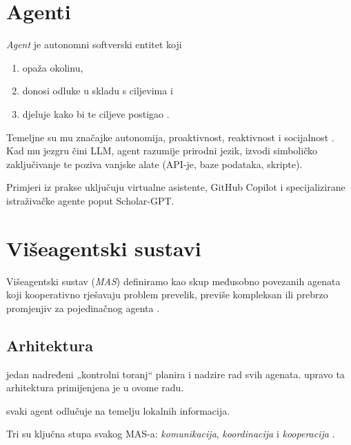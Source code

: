 \documentclass[zavrsnirad]{fer}
\begin{document}
\section{Agenti}
\label{subsec:Agent}

\emph{Agent} je autonomni softverski entitet koji
\begin{enumerate}[label=(\alph*)]
  \item opaža okolinu,
  \item donosi odluke u skladu s ciljevima i
  \item djeluje kako bi te ciljeve postigao \cite{wooldridge1995}.
\end{enumerate}
Temeljne su mu značajke autonomija, proaktivnost, reaktivnost i
socijalnost \cite{tweedale2007}.
Kad mu jezgru čini LLM, agent
razumije prirodni jezik,
izvodi simboličko zaključivanje
te poziva vanjske alate
(API-je, baze podataka, skripte).

Primjeri iz prakse uključuju virtualne asistente,
GitHub Copilot i specijalizirane istraživačke agente
poput Scholar-GPT.

\section{Višeagentski sustavi}
\label{subsec:MAS}

Višeagentski sustav (\emph{MAS}) definiramo kao
skup međusobno povezanih agenata koji kooperativno rješavaju
problem prevelik, previše kompleksan ili prebrzo promjenjiv
za pojedinačnog agenta \cite{wooldridge1995}.

\subsection{Arhitektura}
\begin{description}[labelwidth=3.6cm,leftmargin=3.8cm]
  \item[Centralizirani MAS] jedan nadređeni
        „kontrolni toranj“ planira i nadzire rad svih agenata\cite{galileo2025}.
        upravo ta arhitektura primijenjena je u ovome radu.
  \item[Decentralizirani MAS] svaki agent odlučuje
        na temelju lokalnih informacija.
\end{description}

\noindent
Tri su ključna stupa svakog MAS-a:
\emph{komunikacija}, \emph{koordinacija} i \emph{kooperacija}
\cite{tweedale2007}.
\end{document}
